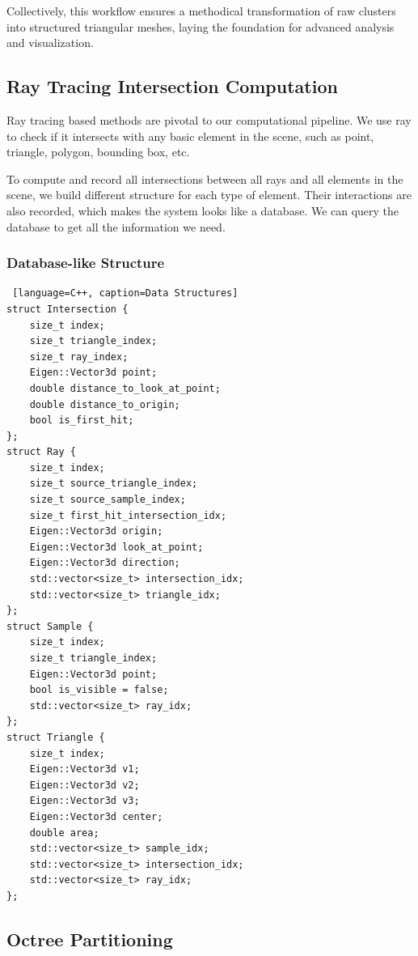 \documentclass[11pt, a4paper,oneside,chapterprefix=false]{scrbook}
\begin{document}
Collectively, this workflow ensures a methodical transformation of raw clusters into structured triangular meshes, laying the foundation for advanced analysis and visualization.


\subsection{Ray Tracing Intersection Computation} \label{sec:ray tracing}

Ray tracing based methods are pivotal to our computational pipeline. We use ray to check if it intersects with any basic element in the scene, such as point, triangle, polygon, bounding box, etc.

To compute and record all intersections between all rays and all elements in the scene, we build different structure for each type of element. Their interactions are also recorded, which makes the system looks like a database. We can query the database to get all the information we need.  

\subsubsection{Database-like Structure}

\begin{lstlisting} [language=C++, caption=Data Structures]
struct Intersection {
    size_t index;
    size_t triangle_index;
    size_t ray_index;
    Eigen::Vector3d point;
    double distance_to_look_at_point;
    double distance_to_origin;
    bool is_first_hit;
};
struct Ray { 
    size_t index;
    size_t source_triangle_index;
    size_t source_sample_index;
    size_t first_hit_intersection_idx;
    Eigen::Vector3d origin;
    Eigen::Vector3d look_at_point;
    Eigen::Vector3d direction;
    std::vector<size_t> intersection_idx;
    std::vector<size_t> triangle_idx;
};
struct Sample {
    size_t index;
    size_t triangle_index;
    Eigen::Vector3d point;
    bool is_visible = false;
    std::vector<size_t> ray_idx;
};
struct Triangle {
    size_t index;
    Eigen::Vector3d v1;
    Eigen::Vector3d v2;
    Eigen::Vector3d v3;
    Eigen::Vector3d center;
    double area;
    std::vector<size_t> sample_idx;
    std::vector<size_t> intersection_idx;
    std::vector<size_t> ray_idx;
};

\end{lstlisting}

\subsection{Octree Partitioning}
\end{document}
